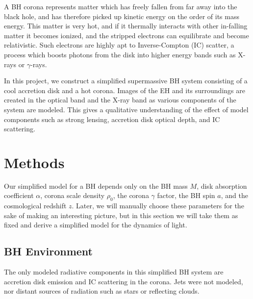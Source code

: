 \documentclass[twocolumn,twocolappendix]{aastex631}
\begin{document}
A BH corona represents matter which has freely fallen from far away into the black hole, and has therefore picked up kinetic energy on the order of its mass energy. This matter is very hot, and if it thermally interacts with other in-falling matter it becomes ionized, and the stripped electrons can equilibrate and become relativistic. Such electrons are highly apt to Inverse-Compton (IC) scatter, a process which boosts photons from the disk into higher energy bands such as X-rays or $\gamma$-rays.

In this project, we construct a simplified supermassive BH system consisting of a cool accretion disk and a hot corona. Images of the EH and its surroundings are created in the optical band and the X-ray band as various components of the system are modeled. This gives a qualitative understanding of the effect of model components such as strong lensing, accretion disk optical depth, and IC scattering.

\section{Methods}

Our simplified model for a BH depends only on the BH mass $M$, disk absorption coefficient $\alpha$, corona scale density $\rho_0$, the corona $\gamma$ factor, the BH spin $a$, and the cosmological redshift $z$. Later, we will manually choose these parameters for the sake of making an interesting picture, but in this section we will take them as fixed and derive a simplified model for the dynamics of light.

\subsection{BH Environment}

The only modeled radiative components in this simplified BH system are accretion disk emission and IC scattering in the corona. Jets were not modeled, nor distant sources of radiation such as stars or reflecting clouds. 
\end{document}
